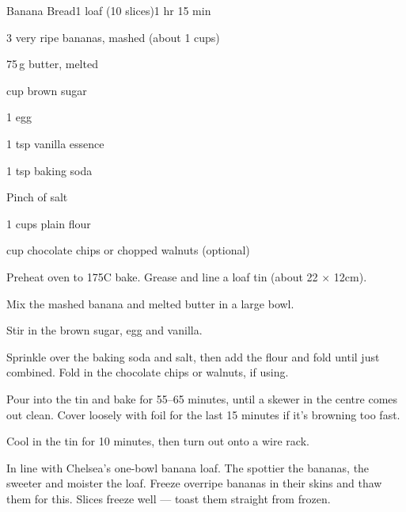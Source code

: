 \begin{recipebox}{Banana Bread}{1 loaf (10 slices)}{1 hr 15 min}
\begin{ingredients}
  \item 3 very ripe bananas, mashed (about 1 cups)
  \item 75\,g butter, melted
  \item {} cup brown sugar
  \item 1 egg
  \item 1 tsp vanilla essence
  \item 1 tsp baking soda
  \item Pinch of salt
  \item 1 cups plain flour
  \item {} cup chocolate chips or chopped walnuts (optional)
\end{ingredients}

\begin{method}
  \item Preheat oven to 175\degree C bake. Grease and line a loaf tin (about 22 $\times$ 12cm).
  \item Mix the mashed banana and melted butter in a large bowl.
  \item Stir in the brown sugar, egg and vanilla.
  \item Sprinkle over the baking soda and salt, then add the flour and fold until just combined. Fold in the chocolate chips or walnuts, if using.
  \item Pour into the tin and bake for 55--65 minutes, until a skewer in the centre comes out clean. Cover loosely with foil for the last 15 minutes if it's browning too fast.
  \item Cool in the tin for 10 minutes, then turn out onto a wire rack.
\end{method}

\begin{notes}
In line with Chelsea's one-bowl banana loaf. The spottier the bananas, the sweeter and moister the loaf. Freeze overripe bananas in their skins and thaw them for this.
Slices freeze well --- toast them straight from frozen.
\end{notes}
\end{recipebox}

